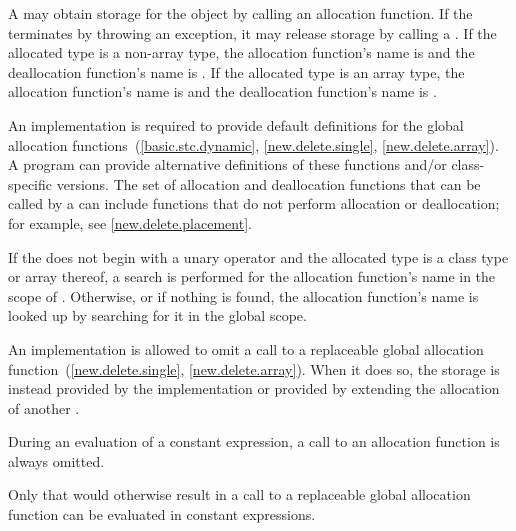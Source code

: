\pnum
A  may obtain storage for the object by calling an
allocation function. If
the  terminates by throwing an exception, it
may release storage by calling a . If the allocated type
is a non-array type, the allocation function's name is
%
%
 and the deallocation function's name is
. If the allocated type is an array type, the
allocation function's name is
%
%
and the deallocation function's name is
.
\begin{note}
An implementation is required to provide default definitions for the global
allocation
functions~(\ref{basic.stc.dynamic}, \ref{new.delete.single}, \ref{new.delete.array}).
A \Cpp{} program can provide alternative definitions of
these functions and/or class-specific
versions.
The set of allocation and deallocation functions that can be called
by a 
can include functions that do not perform allocation or deallocation;
for example, see \ref{new.delete.placement}.
\end{note}

\pnum
{}%
If the 
does not begin with a unary \tcode{::} operator and
the allocated type is a class type  or array thereof,
a search is performed for the allocation function's name in the scope
of .
Otherwise, or if nothing is found,
the allocation function's name is looked up by
searching for it in the global scope.

\pnum
An implementation is allowed to omit a call to a replaceable global allocation
function~(\ref{new.delete.single}, \ref{new.delete.array}). When it does so,
the storage is instead provided by the implementation or provided by extending
the allocation of another .

\pnum
During an evaluation of a constant expression,
a call to an allocation function is always omitted.
\begin{note}
Only  that would otherwise result in
a call to a replaceable global allocation function
can be evaluated in constant expressions.
\end{note}

